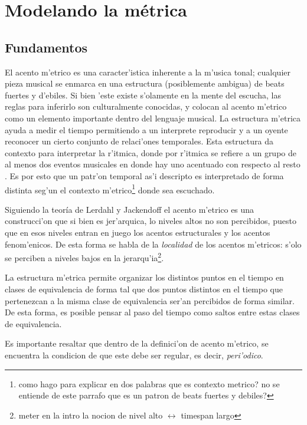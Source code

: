 \section{Modelando la m\'etrica}
\subsection{Fundamentos}
El acento m'etrico es una caracter'istica inherente a la m'usica tonal; cualquier pieza musical se enmarca en una estructura 
(posiblemente ambigua) de beats fuertes y d'ebiles. Si bien 'este existe s'olamente en la mente del escucha, las reglas para inferirlo son culturalmente conocidas, 
y colocan al acento m'etrico como un elemento importante dentro del lenguaje musical. La estructura m'etrica ayuda a medir el tiempo permitiendo a un interprete 
reproducir y a un oyente reconocer un cierto conjunto de relaci'ones temporales. Esta estructura da contexto para interpretar la r'itmica,  
donde por r'itmica se refiere a un grupo de al menos dos eventos musicales en donde hay uno acentuado con respecto al resto \cite{CooperMeyer60}.
Es por esto que un patr'on temporal as'i descripto es interpretado de forma distinta seg'un el contexto m'etrico\footnote{como hago para explicar en dos palabras que es contexto metrico? no se entiende de este parrafo que es un patron de beats fuertes y debiles?} donde sea escuchado. 

Siguiendo la teor\'ia de Lerdahl y Jackendoff el acento m'etrico es una construcci'on que si bien es jer'arquica, lo niveles altos no son percibidos, puesto
que en esos niveles entran en juego los acentos estructurales y los acentos fenom'enicos. De esta forma se habla de la \emph{localidad} de los acentos m'etricos: 
s'olo se perciben a niveles bajos en la jerarqu'ia\footnote{meter en la intro la nocion de nivel alto $\leftrightarrow$ timespan largo}. 

La estructura m'etrica permite organizar los distintos puntos en el tiempo en clases de 
equivalencia de forma tal que dos puntos distintos en el tiempo que pertenezcan a la misma clase de equivalencia ser'an percibidos de forma similar\cite{Benjamin84}. 
De esta forma, es posible pensar al paso del tiempo como saltos entre estas clases de equivalencia. 

Es importante resaltar que dentro de la definici'on de acento m'etrico, se encuentra la condicion de que este debe ser regular, es decir, \emph{peri'odico}. 

